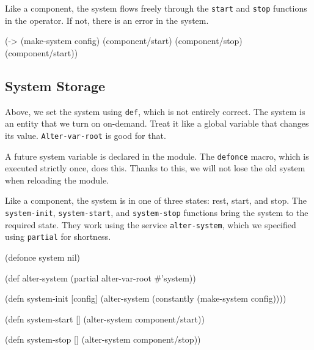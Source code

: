 \fi

Like a component, the system flows freely through the \verb|start| and \verb|stop| functions in the \arr operator. If not, there is an error in the system.

\begin{english}
  \begin{clojure}
(-> (make-system config)
    (component/start)
    (component/stop)
    (component/start))
  \end{clojure}
\end{english}

\subsection{System Storage}


Above, we set the system using \verb|def|, which is not entirely correct. The system is an entity that we turn on on-demand. Treat it like a global variable that changes its value. \verb|Alter-var-root| is good for that.

A future system variable is declared in the module. The \verb|defonce| macro, which is executed strictly once, does this. Thanks to this, we will not lose the old system when reloading the module.

Like a component, the system is in one of three states: rest, start, and stop. The \verb|system-init|, \verb|system-start|, and \verb|system-stop| functions bring the system to the required state. They work using the service \verb|alter-system|, which we specified using \verb|partial| for shortness.


\ifnarrow

\begin{english}
  \begin{clojure}
(defonce system nil)

(def alter-system
  (partial alter-var-root #'system))

(defn system-init [config]
  (alter-system
    (constantly (make-system config))))

(defn system-start []
  (alter-system component/start))

(defn system-stop []
  (alter-system component/stop))
  \end{clojure}
\end{english}

\else

